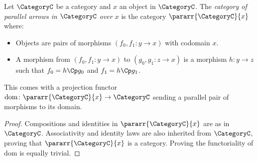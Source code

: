     \begingroup
    \def\thedefinition{\ref{def: category of parallel arrows}}
    \begin{definition}
        Let $\CategoryC$ be a category and $x$ an object in $\CategoryC$.
        The \emph{category of parallel arrows in $\CategoryC$ over $x$} is the category $\pararr{\CategoryC}{x}$ where:
        \begin{itemize}
            \item Objects are pairs of morphisms $(f_0, f_1\colon y \to x)$ with codomain $x$.
            \item A morphism from $(f_0, f_1\colon y \to x)$ to $(g_0, g_1\colon z \to x)$ is a morphism $h\colon y \to z$ such that $f_0 = h\Cp g_0$ and $f_1 = h\Cp g_1$.
        \end{itemize}
        This comes with a projection functor $\mathrm{dom}\colon \pararr{\CategoryC}{x} \to \CategoryC$ sending a parallel pair of morphisms to its domain.
    \end{definition}
    \addtocounter{definition}{-1}
    \endgroup
    \begin{proof}
        Compositions and identities in $\pararr{\CategoryC}{x}$ are as in $\CategoryC$. Associativity and identity laws are also inherited from $\CategoryC$, proving that $\pararr{\CategoryC}{x}$ is a category. Proving the functoriality of $\mathrm{dom}$ is equally trivial.
    \end{proof}

